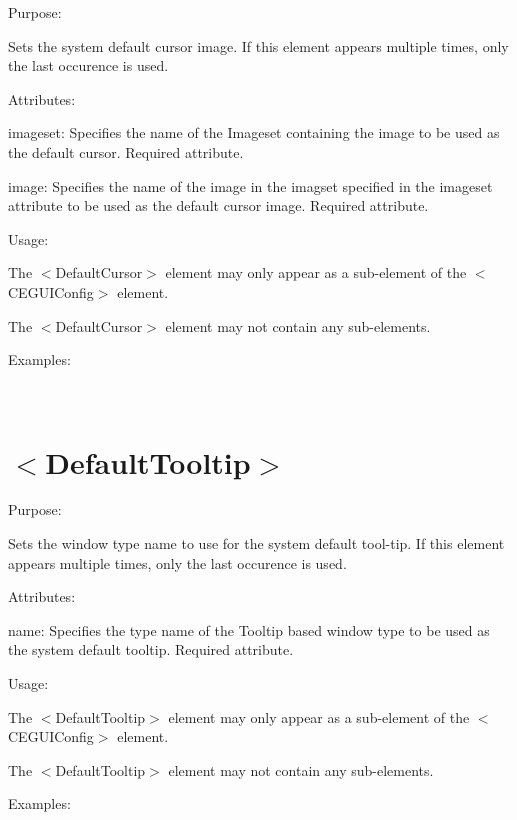 \begin{DoxyItemize}
\item Purpose\+:
\begin{DoxyItemize}
\item Sets the system default cursor image. If this element appears multiple times, only the last occurence is used.
\end{DoxyItemize}
\item Attributes\+:
\begin{DoxyItemize}
\item {\ttfamily imageset\+:} Specifies the name of the Imageset containing the image to be used as the default cursor. Required attribute.
\item {\ttfamily image\+:} Specifies the name of the image in the imagset specified in the {\ttfamily imageset} attribute to be used as the default cursor image. Required attribute.
\end{DoxyItemize}
\item Usage\+:
\begin{DoxyItemize}
\item The $<$Default\+Cursor$>$ element may only appear as a sub-\/element of the $<$C\+E\+G\+U\+I\+Config$>$ element.
\item The $<$Default\+Cursor$>$ element may not contain any sub-\/elements.
\end{DoxyItemize}
\item Examples\+:
\end{DoxyItemize}

~\newline
 \hypertarget{xml_config_xml_config_tooltip}{}\section{$<$\+Default\+Tooltip$>$}\label{xml_config_xml_config_tooltip}

\begin{DoxyItemize}
\item Purpose\+:
\begin{DoxyItemize}
\item Sets the window type name to use for the system default tool-\/tip. If this element appears multiple times, only the last occurence is used.
\end{DoxyItemize}
\item Attributes\+:
\begin{DoxyItemize}
\item {\ttfamily name\+:} Specifies the type name of the Tooltip based window type to be used as the system default tooltip. Required attribute.
\end{DoxyItemize}
\item Usage\+:
\begin{DoxyItemize}
\item The $<$Default\+Tooltip$>$ element may only appear as a sub-\/element of the $<$C\+E\+G\+U\+I\+Config$>$ element.
\item The $<$Default\+Tooltip$>$ element may not contain any sub-\/elements.
\end{DoxyItemize}
\item Examples\+:
\end{DoxyItemize}

